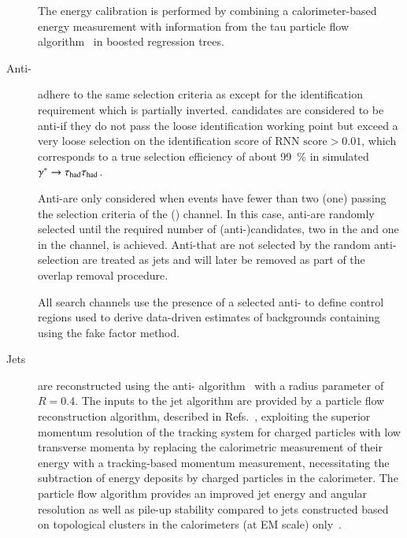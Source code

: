 \begin{description}
  The \tauhadvis energy calibration is performed by combining a
  calorimeter-based energy measurement with information from the tau
  particle flow algorithm~\cite{PERF-2014-06} in boosted regression
  trees.


\item[Anti-\tauhadvis] adhere to the same selection criteria as
  \tauhadvis except for the \tauhadvis identification requirement
  which is partially inverted. \tauhadvis candidates are considered to
  be anti-\tauhadvis if they do not pass the loose \tauhadvis
  identification working point but exceed a very loose selection on
  the \tauhadvis identification score of $\text{RNN score} > 0.01$,
  which corresponds to a true \tauhadvis selection efficiency of about
  \SI{99}{\percent} in simulated $\gamma^* \to \tau_{\text{had}}\tau_{\text{had}}$.

  Anti-\tauhadvis are only considered when events have fewer than two
  (one) \tauhadvis passing the selection criteria of the \hadhad
  (\lephad) channel. In this case, anti-\tauhadvis are randomly
  selected until the required number of (anti-)\tauhadvis candidates,
  two in the \hadhad and one in the \lephad channel, is
  achieved. Anti-\tauhadvis that are not selected by the random
  anti-\tauhadvis selection are treated as jets and will later be
  removed as part of the overlap removal procedure.

  All search channels use the presence of a selected anti-\tauhadvis
  to define control regions used to derive data-driven estimates of
  backgrounds containing \faketauhadvis using the fake factor method.

\item[Jets] are reconstructed using the anti-\kt
  algorithm~\cite{Cacciari:2008gp} with a radius parameter
  of~$R = 0.4$. The inputs to the jet algorithm are provided by a
  particle flow reconstruction algorithm, described in
  Refs.~\cite{PERF-2015-09,JETM-2018-05}, exploiting the superior
  momentum resolution of the tracking system for charged particles
  with low transverse momenta by replacing the calorimetric
  measurement of their energy with a tracking-based momentum
  measurement, necessitating the subtraction of energy deposits by
  charged particles in the calorimeter. The particle flow algorithm
  provides an improved jet energy and angular resolution as well as
  pile-up stability compared to jets constructed based on topological
  clusters in the calorimeters (at EM scale)
  only~\cite{PERF-2015-09,JETM-2018-05}.


\end{description}
